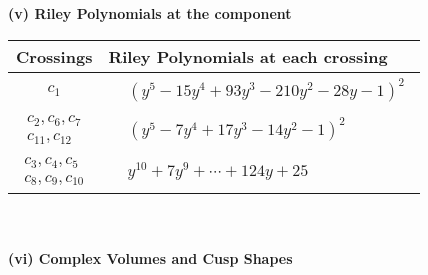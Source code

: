 \documentclass[1p]{elsarticle_modified}
\theoremstyle{definition}
\begin{document}
\newpage\renewcommand{\arraystretch}{1}
\flushleft \textbf{(v) Riley Polynomials at the component}\newline \\
\begin{tabular}{m{50pt}|m{274pt}}
Crossings & \hspace{64pt}Riley Polynomials at each crossing \\
\hline $$\begin{aligned}c_{1}\end{aligned}$$&$\begin{aligned}
&(y^5-15 y^4+93 y^3-210 y^2-28 y-1)^2
\end{aligned}$\\
\hline $$\begin{aligned}c_{2},c_{6},c_{7}\\c_{11},c_{12}\end{aligned}$$&$\begin{aligned}
&(y^5-7 y^4+17 y^3-14 y^2-1)^2
\end{aligned}$\\
\hline $$\begin{aligned}c_{3},c_{4},c_{5}\\c_{8},c_{9},c_{10}\end{aligned}$$&$\begin{aligned}
&y^{10}+7 y^9+\cdots+124 y+25
\end{aligned}$\\
\hline
\end{tabular}\\~\\
\newpage\flushleft \textbf{(vi) Complex Volumes and Cusp Shapes}
\end{document}
